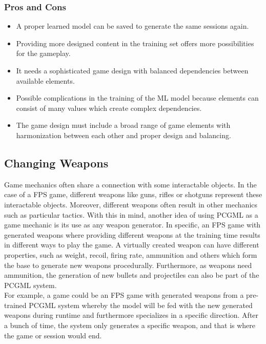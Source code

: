 \documentclass[MGS,Master,english]{twbook}%
\begin{document}
\subsubsection{Pros and Cons}
\begin{itemize}
	\item A proper learned model can be saved to generate the same sessions again.
	\item Providing more designed content in the training set offers more possibilities for the gameplay.
	\item It needs a sophisticated game design with balanced dependencies between available elements.
	\item Possible complications in the training of the ML model because elements can consist of many values which create complex dependencies.
	\item The game design must include a broad range of game elements with harmonization between each other and proper design and balancing.
\end{itemize}

\subsection{Changing Weapons} \label{idea::changingWeapons}
Game mechanics often share a connection with some interactable objects. In the case of a \ac{FPS} game, different weapons like guns, rifles or shotguns represent these interactable objects. Moreover, different weapons often result in other mechanics such as particular tactics. With this in mind, another idea of using PCGML as a game mechanic is its use as any weapon generator. In specific, an FPS game with generated weapons where providing different weapons at the training time results in different ways to play the game. A virtually created weapon can have different properties, such as weight, recoil, firing rate, ammunition and others which form the base to generate new weapons procedurally. Furthermore, as weapons need ammunition, the generation of new bullets and projectiles can also be part of the PCGML system. \\
For example, a game could be an FPS game with generated weapons from a pre-trained PCGML system whereby the model will be fed with the new generated weapons during runtime and furthermore specializes in a specific direction. After a bunch of time, the system only generates a specific weapon, and that is where the game or session would end.
\end{document}
